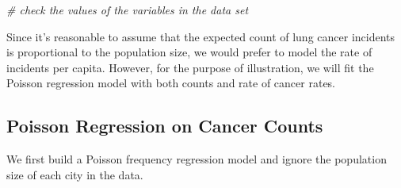 \documentclass[
]{book}
\newenvironment{Shaded}{\begin{snugshade}}{\end{snugshade}}
\newcommand{\AttributeTok}[1]{\textcolor[rgb]{0.13,0.29,0.53}{#1}}
\newcommand{\CommentTok}[1]{\textcolor[rgb]{0.56,0.35,0.01}{\textit{#1}}}
\newcommand{\DocumentationTok}[1]{\textcolor[rgb]{0.56,0.35,0.01}{\textbf{\textit{#1}}}}
\newcommand{\FunctionTok}[1]{\textcolor[rgb]{0.13,0.29,0.53}{\textbf{#1}}}
\newcommand{\NormalTok}[1]{#1}
\newcommand{\OtherTok}[1]{\textcolor[rgb]{0.56,0.35,0.01}{#1}}
\newcommand{\SpecialCharTok}[1]{\textcolor[rgb]{0.81,0.36,0.00}{\textbf{#1}}}
\newcommand{\StringTok}[1]{\textcolor[rgb]{0.31,0.60,0.02}{#1}}
\begin{document}
\begin{Shaded}
\begin{Highlighting}[]
\CommentTok{\# check the values of the variables in the data set}
\end{Highlighting}
\end{Shaded}

Since it's reasonable to assume that the expected count of lung cancer incidents is proportional to the population size, we would prefer to model the rate of incidents per capita. However, for the purpose of illustration, we will fit the Poisson regression model with both counts and rate of cancer rates.

\hypertarget{poisson-regression-on-cancer-counts-1}{%
\subsection{Poisson Regression on Cancer Counts}\label{poisson-regression-on-cancer-counts-1}}

We first build a Poisson frequency regression model and ignore the population size of each city in the data.

\begin{Shaded}
\end{Shaded}
\end{document}
